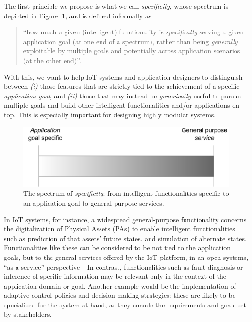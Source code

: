 The first principle we propose is what we call \emph{specificity}, whose spectrum is depicted in Figure~\ref{fig:specificity}, and is defined informally as 
\begin{quote}
    ``how much a given (intelligent) functionality is \emph{specifically} serving a given application goal (at one end of a spectrum), rather than being \emph{generally} exploitable by multiple goals and potentially across application scenarios (at the other end)''.
\end{quote}
%
With this, we want to help IoT systems and application designers to distinguish between 
\emph{(i)} those features that are strictly tied to the achievement of a specific \emph{application goal}, and 
\emph{(ii)} those that may instead be \emph{generically} useful to pursue multiple goals and build other intelligent functionalities and/or applications on top. 
%
This is especially important for designing highly modular systems. 
%

\begin{figure}[!b]
    \centering
    \includegraphics[width=.6\columnwidth]{figures/dt-mas/specificity-spectrum.pdf}
    \caption{The spectrum of \emph{specificity}: from intelligent functionalities specific to an application goal to general-purpose services.}
    \label{fig:specificity}
\end{figure}

In IoT systems, for instance, a widespread general-purpose functionality concerns the digitalization of Physical Assets (PAs) to enable intelligent functionalities such as prediction of that assets' future states, and simulation of alternate states. 
%
%
Functionalities like these can be considered to be not tied to the application goals, but to the general services offered by the IoT platform, in an open systems, ``as-a-service'' perspective~\cite{10.1145/3507909}. 
%
In contrast, functionalities such as fault diagnosis or inference of specific information may be relevant only in the context of the application domain or goal. 
Another example would be the implementation of adaptive control policies and decision-making strategies: these are likely to be specialised for the system at hand, as they encode the requirements and goals set by stakeholders. 

